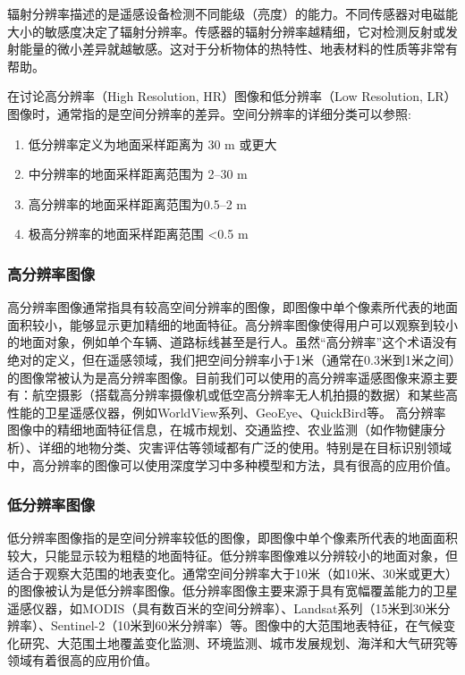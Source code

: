 辐射分辨率描述的是遥感设备检测不同能级（亮度）的能力。不同传感器对电磁能大小的敏感度决定了辐射分辨率。传感器的辐射分辨率越精细，它对检测反射或发射能量的微小差异就越敏感。这对于分析物体的热特性、地表材料的性质等非常有帮助。


在讨论高分辨率（High Resolution, HR）图像和低分辨率（Low Resolution, LR）图像时，通常指的是空间分辨率的差异。空间分辨率的详细分类可以参照\cite{MultispectralImageAnalysisUsingObjectOrientedParadigm}:
\begin{enumerate}
    \item 低分辨率定义为地面采样距离为 30 m 或更大
    \item 中分辨率的地面采样距离范围为 2–30 m
    \item 高分辨率的地面采样距离范围为0.5–2 m
    \item 极高分辨率的地面采样距离范围 <0.5 m
\end{enumerate}

\subsubsection{高分辨率图像}
高分辨率图像通常指具有较高空间分辨率的图像，即图像中单个像素所代表的地面面积较小，能够显示更加精细的地面特征\cite{shimizu1983laser}。高分辨率图像使得用户可以观察到较小的地面对象，例如单个车辆、道路标线甚至是行人。虽然“高分辨率”这个术语没有绝对的定义，但在遥感领域，我们把空间分辨率小于1米（通常在0.3米到1米之间）的图像常被认为是高分辨率图像。目前我们可以使用的高分辨率遥感图像来源主要有：航空摄影（搭载高分辨率摄像机或低空高分辨率无人机拍摄的数据）和某些高性能的卫星遥感仪器，例如WorldView系列\cite{scitor2000project}、GeoEye、QuickBird等。
高分辨率图像中的精细地面特征信息，在城市规划、交通监控、农业监测（如作物健康分析）、详细的地物分类、灾害评估等领域都有广泛的使用。特别是在目标识别领域中，高分辨率的图像可以使用深度学习中多种模型和方法，具有很高的应用价值。


\subsubsection{低分辨率图像}

低分辨率图像指的是空间分辨率较低的图像，即图像中单个像素所代表的地面面积较大，只能显示较为粗糙的地面特征。低分辨率图像难以分辨较小的地面对象，但适合于观察大范围的地表变化。通常空间分辨率大于10米（如10米、30米或更大）的图像被认为是低分辨率图像。低分辨率图像主要来源于具有宽幅覆盖能力的卫星遥感仪器，如MODIS（具有数百米的空间分辨率）、Landsat系列（15米到30米分辨率）、Sentinel-2（10米到60米分辨率）等。图像中的大范围地表特征，在气候变化研究、大范围土地覆盖变化监测、环境监测、城市发展规划、海洋和大气研究等领域有着很高的应用价值。

